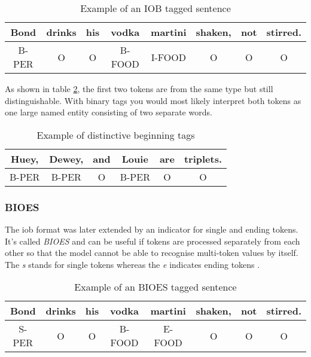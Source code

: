 \begin{table}[h!]
    \centering
    \begin{tabular}{|c|c|c|c|c|c|c|c|}
        \hline
        Bond & drinks & his & vodka & martini & shaken, & not & stirred. \\
        \hline
        B-PER & O & O & B-FOOD & I-FOOD & O & O & O \\
        \hline
    \end{tabular}
    \caption{Example of an IOB tagged sentence}
    \label{tbl:iob-labelling}
\end{table}

As shown in table \ref{tbl:iob-labelling2}, the first two tokens are from the same type but still distinguishable. With binary tags you
would most likely interpret both tokens as one large named entity consisting of two separate words.

\begin{table}[ht!]
    \centering
    \begin{tabular}{|c|c|c|c|c|c|}
        \hline
        Huey, & Dewey, & and & Louie & are & triplets. \\
        \hline
        B-PER & B-PER & O & B-PER & O & O \\
        \hline
    \end{tabular}
    \caption{Example of distinctive beginning tags}
    \label{tbl:iob-labelling2}
\end{table}

\subsubsection{BIOES}

The \acrshort{iob} format was later extended by an indicator for single and ending tokens. It's called \emph{BIOES} and can be useful if
tokens are processed separately from each other so that the model cannot be able to recognise multi-token values by itself.
The \emph{s} stands for single tokens whereas the \emph{e} indicates ending tokens \cite{hofer18}.

\begin{table}[h!]
    \centering
    \begin{tabular}{|c|c|c|c|c|c|c|c|}
        \hline
        Bond & drinks & his & vodka & martini & shaken, & not & stirred. \\
        \hline
        S-PER & O & O & B-FOOD & E-FOOD & O & O & O \\
        \hline
    \end{tabular}
    \caption{Example of an BIOES tagged sentence}
    \label{tbl:bioes-labelling}
\end{table}
